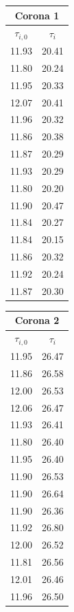 \documentclass[a4paper]{article}
\begin{document}
\begin{table}[!ht]
    \centering
    \begin{tabular}{|c|c|}
    \hline
    \multicolumn{2}{|c|}{Corona 1} \\
    \hline 
    $\tau_{i,0}$ & $\tau_i$ \\
    \hline
    11.93 & 20.41 \\
    11.80 & 20.24 \\
    11.95 & 20.33 \\
    12.07 & 20.41 \\
    11.96 & 20.32 \\
    11.86 & 20.38 \\
    11.87 & 20.29 \\
    11.93 & 20.29 \\
    11.80 & 20.20 \\
    11.90 & 20.47 \\
    11.84 & 20.27 \\
    11.84 & 20.15 \\ 
    11.86 & 20.32 \\
    11.92 & 20.24 \\
    11.87 & 20.30 \\
    \hline
    \end{tabular}
    \quad
    \begin{tabular}{|c|c|}
    \hline
    \multicolumn{2}{|c|}{Corona 2} \\
    \hline 
    $\tau_{i,0}$ & $\tau_i$ \\
    \hline
    11.95 & 26.47 \\
    11.86 & 26.58 \\
    12.00 & 26.53 \\
    12.06 & 26.47 \\
    11.93 & 26.41 \\ 
    11.80 & 26.40 \\
    11.95 & 26.40 \\
    11.90 & 26.53 \\
    11.90 & 26.64 \\
    11.90 & 26.36 \\
    11.92 & 26.80 \\
    12.00 & 26.52 \\
    11.81 & 26.56 \\
    12.01 & 26.46 \\
    11.96 & 26.50 \\
    \hline
    \end{tabular}
    \quad
    \begin{tabular}{|c|c|}

\end{tabular}
\end{table}
\end{document}
